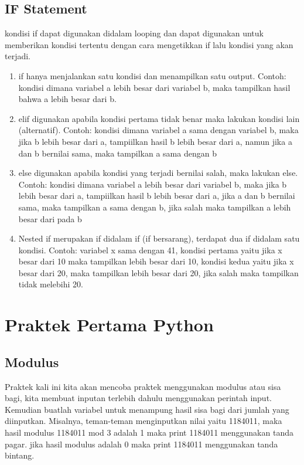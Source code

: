 \subsection{IF Statement}
kondisi if dapat digunakan didalam looping dan dapat digunakan untuk memberikan kondisi tertentu dengan cara mengetikkan if lalu kondisi yang akan terjadi.\\
\begin{enumerate}
 \item if hanya menjalankan satu kondisi dan menampilkan satu output. Contoh: kondisi dimana variabel a lebih besar dari variabel b, maka tampilkan hasil bahwa a lebih besar dari b.

 \item elif digunakan apabila kondisi pertama tidak benar maka lakukan kondisi lain (alternatif). Contoh: kondisi dimana variabel a sama dengan variabel b, maka jika b lebih besar dari a, tampiilkan hasil b lebih besar dari a, namun jika a dan b bernilai sama, maka tampilkan a sama dengan b

\item else digunakan apabila kondisi yang terjadi bernilai salah, maka lakukan else. Contoh: kondisi dimana variabel a lebih besar dari variabel b, maka jika b lebih besar dari a, tampiilkan hasil b lebih besar dari a, jika a dan b bernilai sama, maka tampilkan a sama dengan b, jika salah maka tampilkan a lebih besar dari pada b

\item Nested if merupakan if didalam if (if bersarang), terdapat dua if didalam satu kondisi. Contoh: variabel x sama dengan 41, kondisi pertama yaitu jika x besar dari 10 maka tampilkan lebih besar dari 10, kondisi kedua yaitu jika x besar dari 20, maka tampilkan lebih besar dari 20, jika salah maka tampilkan tidak melebihi 20.

\end{enumerate}

\section{Praktek Pertama Python}
\subsection{Modulus}
Praktek kali ini kita akan mencoba praktek menggunakan modulus atau sisa bagi, kita membuat inputan terlebih dahulu menggunakan perintah input. Kemudian buatlah variabel untuk menampung hasil sisa bagi dari jumlah yang diinputkan. Misalnya, teman-teman menginputkan nilai yaitu 1184011, maka hasil modulus 1184011 mod 3 adalah 1 maka print 1184011 menggunakan tanda pagar. jika hasil modulus adalah 0 maka print 1184011 menggunakan tanda bintang.

